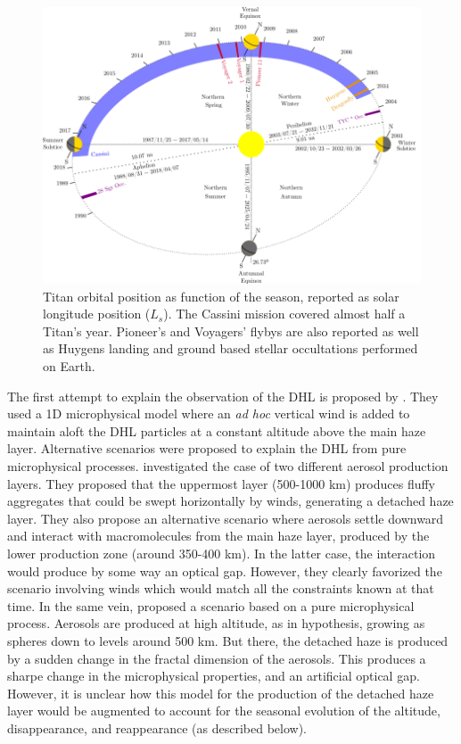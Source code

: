 \begin{figure}[!ht]
    \centering
    \includegraphics[width=\textwidth]{Fig/Titan_seasons.png}  %
    \caption{Titan orbital position as function of the season, reported as solar longitude position ($L_s$).
             The Cassini mission covered almost half a Titan's year. Pioneer's and Voyagers' flybys are also reported
             as well as Huygens landing and ground based stellar occultations performed on Earth.}
    \label{fig:titan_seasons}
\end{figure}

The first attempt to explain the observation of the DHL is proposed by \cite{Toon1992}. They used a 1D microphysical
model where an \emph{ad hoc} vertical wind is added to maintain aloft the DHL particles at a constant altitude above the main
haze layer. Alternative scenarios were proposed to explain the DHL from pure microphysical processes. \cite{Chassefiere1995}
investigated the case of two different aerosol production layers. They proposed that the uppermost layer (500-1000 km)
produces fluffy aggregates that could be swept horizontally by winds, generating a detached haze layer. They also
propose an alternative scenario where aerosols settle downward and interact with macromolecules from the main haze layer,
produced by the lower production zone (around 350-400 km). In the latter case, the interaction would produce by some
way an optical gap. However, they clearly favorized the scenario involving winds which would match all the constraints
known at that time. In the same vein, \cite{Lavvas2009} proposed a scenario based on a pure microphysical process. Aerosols
are produced at high altitude, as in \cite{Chassefiere1995} hypothesis, growing as spheres down to levels around 500 km.
But there, the detached haze is produced by a sudden change in the fractal dimension of the aerosols. This produces a
sharpe change in the microphysical properties, and an artificial optical gap. However, it is unclear how this model for the
production of the detached haze layer would be augmented to account for the seasonal evolution of the altitude,
disappearance, and reappearance (as described below).

